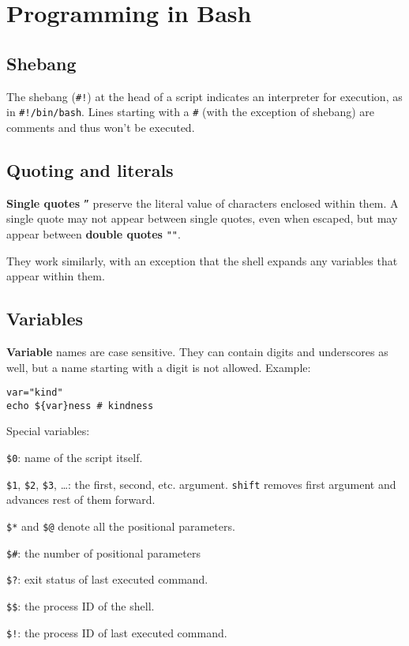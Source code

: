 \section{Programming in Bash}
\subsection{Shebang}
The shebang (\texttt{\#!}) at the head of a script indicates an
interpreter for execution, as in \texttt{\#!/bin/bash}.
Lines starting with a \texttt{\#} (with the exception of shebang)
are comments and thus won't be executed.

\subsection{Quoting and literals}
\textbf{Single quotes} \texttt{''} preserve the literal value of characters enclosed within them.
A single quote may not appear between single quotes, even when escaped, but may appear between \textbf{double quotes} \texttt{""}.

They work similarly, with an exception that the shell expands any variables that appear within them.

\subsection{Variables}
\textbf{Variable} names are case sensitive.
They can contain digits and underscores as well,
but a name starting with a digit is not allowed.
Example:
\begin{verbatim}
var="kind"
echo ${var}ness # kindness
\end{verbatim}

Special variables:
\begin{compactenum}
    \item \texttt{\$0}: name of the script itself.
    \item \texttt{\$1}, \texttt{\$2}, \texttt{\$3}, \ldots: the first, second, etc. argument. \texttt{shift} removes first argument and advances rest of them forward.
    \item \texttt{\$*} and \texttt{\$@} denote all the positional parameters.
    \item \texttt{\$\#}: the number of positional parameters
    \item \texttt{\$?}: exit status of last executed command.
    \item \texttt{\$\$}: the process ID of the shell.
    \item \texttt{\$!}: the process ID of last executed command.
\end{compactenum}

